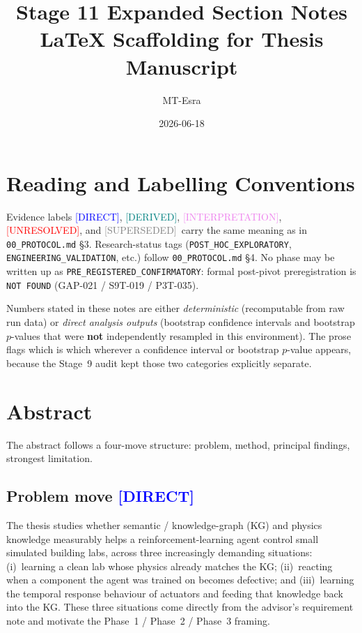 \documentclass[12pt, a4paper, oneside]{memoir}
\title{Stage 11 Expanded Section Notes\\[0.5ex]
       \large LaTeX Scaffolding for Thesis Manuscript}
\author{MT-Esra}
\date{2026-06-18}
\newcommand{\evDirect}{\textcolor{blue}{[DIRECT]}}
\newcommand{\evDerived}{\textcolor{teal}{[DERIVED]}}
\newcommand{\evInterp}{\textcolor{violet}{[INTERPRETATION]}}
\newcommand{\evUnresolved}{\textcolor{red}{[UNRESOLVED]}}
\newcommand{\evSuperseded}{\textcolor{gray}{[SUPERSEDED]}}
\newcommand{\rsPHE}{\texttt{POST\_HOC\_EXPLORATORY}}
\newcommand{\rsEV}{\texttt{ENGINEERING\_VALIDATION}}
\begin{document}
\maketitle
\tableofcontents
\clearpage

\chapter*{Reading and Labelling Conventions}

Evidence labels \evDirect, \evDerived, \evInterp, \evUnresolved, and
\evSuperseded\ carry the same meaning as in \texttt{00\_PROTOCOL.md} §3.
Research-status tags (\rsPHE, \rsEV, etc.) follow \texttt{00\_PROTOCOL.md}
§4. No phase may be written up as
\texttt{PRE\_REGISTERED\_CONFIRMATORY}: formal post-pivot preregistration is
\texttt{NOT FOUND} (GAP-021 / S9T-019 / P3T-035).

Numbers stated in these notes are either \emph{deterministic} (recomputable
from raw run data) or \emph{direct analysis outputs} (bootstrap confidence
intervals and bootstrap $p$-values that were \textbf{not} independently
resampled in this environment).  The prose flags which is which wherever a
confidence interval or bootstrap $p$-value appears, because the Stage~9 audit
kept those two categories explicitly separate.

\chapter{Abstract}
\label{ch:abstract}

The abstract follows a four-move structure: problem, method, principal
findings, strongest limitation.

\section{Problem move \evDirect}

The thesis studies whether semantic / knowledge-graph (KG) and physics
knowledge measurably helps a reinforcement-learning agent control small
simulated building labs, across three increasingly demanding situations:
(i)~learning a clean lab whose physics already matches the KG;
(ii)~reacting when a component the agent was trained on becomes defective;
and
(iii)~learning the temporal response behaviour of actuators and feeding that
knowledge back into the KG\@.
These three situations come directly from the advisor's requirement note and
motivate the Phase~1 / Phase~2 / Phase~3 framing.
\end{document}
